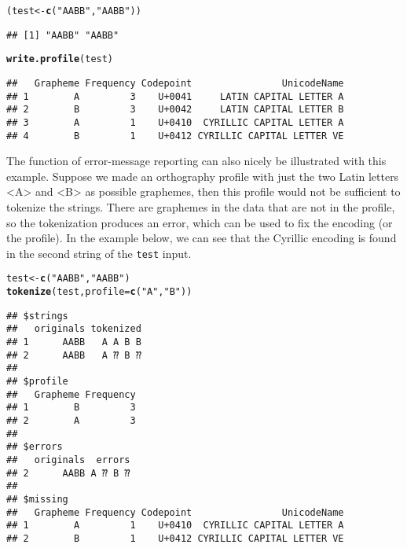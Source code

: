 \documentclass[output=book,nonflat,modfonts,
colorlinks, citecolor=brown,
		]{langsci/langscibook}\usepackage[]{graphicx}\usepackage[]{color}
\makeatletter
\newcommand{\hlstr}[1]{\textcolor[rgb]{0.192,0.494,0.8}{#1}}%
\newcommand{\hlstd}[1]{\textcolor[rgb]{0.345,0.345,0.345}{#1}}%
\newcommand{\hlkwb}[1]{\textcolor[rgb]{0.69,0.353,0.396}{#1}}%
\newcommand{\hlkwc}[1]{\textcolor[rgb]{0.333,0.667,0.333}{#1}}%
\newcommand{\hlkwd}[1]{\textcolor[rgb]{0.737,0.353,0.396}{\textbf{#1}}}%
\newenvironment{kframe}{%
 \def\at@end@of@kframe{}%
 \ifinner\ifhmode%
  \def\at@end@of@kframe{\end{minipage}}%
  \begin{minipage}{\columnwidth}%
 \fi\fi%
 \def\FrameCommand##1{\hskip\@totalleftmargin \hskip-\fboxsep
 \colorbox{shadecolor}{##1}\hskip-\fboxsep
     \hskip-\linewidth \hskip-\@totalleftmargin \hskip\columnwidth}%
 \MakeFramed {\advance\hsize-\width
   \@totalleftmargin\z@ \linewidth\hsize
   \@setminipage}}%
 {\par\unskip\endMakeFramed%
 \at@end@of@kframe}
\newenvironment{knitrout}{}{} %
\makeatother
\begin{document}
\begin{knitrout}\footnotesize
{}\color{fgcolor}\begin{kframe}
\begin{alltt}
\hlstd{(test} \hlkwb{<-} \hlkwd{c}\hlstd{(}\hlstr{"AABB"}\hlstd{,} \hlstr{"AАBВ"}\hlstd{))}
\end{alltt}
\begin{verbatim}
## [1] "AABB" "AАBВ"
\end{verbatim}
\begin{alltt}
\hlkwd{write.profile}\hlstd{(test)}
\end{alltt}
\begin{verbatim}
##   Grapheme Frequency Codepoint                UnicodeName
## 1        A         3    U+0041     LATIN CAPITAL LETTER A
## 2        B         3    U+0042     LATIN CAPITAL LETTER B
## 3        А         1    U+0410  CYRILLIC CAPITAL LETTER A
## 4        В         1    U+0412 CYRILLIC CAPITAL LETTER VE
\end{verbatim}
\end{kframe}
\end{knitrout}

The function of error-message reporting can also nicely be illustrated
with this example. Suppose we made an orthography profile with just the two
Latin letters <A> and <B> as possible graphemes, then this profile would not be
sufficient to tokenize the strings. There are graphemes in the data that are not
in the profile, so the tokenization produces an error, which can be used to fix
the encoding (or the profile). In the example below, we can see that the
Cyrillic encoding is found in the second string of the \texttt{test} input.

\begin{knitrout}\footnotesize
{}\color{fgcolor}\begin{kframe}
\begin{alltt}
\hlstd{test} \hlkwb{<-} \hlkwd{c}\hlstd{(}\hlstr{"AABB"}\hlstd{,} \hlstr{"AАBВ"}\hlstd{)}
\hlkwd{tokenize}\hlstd{(test,} \hlkwc{profile} \hlstd{=} \hlkwd{c}\hlstd{(}\hlstr{"A"}\hlstd{,} \hlstr{"B"}\hlstd{))}
\end{alltt}


{\ttfamily\noindent{}}\begin{verbatim}
## $strings
##   originals tokenized
## 1      AABB   A A B B
## 2      AАBВ   A ⁇ B ⁇
## 
## $profile
##   Grapheme Frequency
## 1        B         3
## 2        A         3
## 
## $errors
##   originals  errors
## 2      AАBВ A ⁇ B ⁇
## 
## $missing
##   Grapheme Frequency Codepoint                UnicodeName
## 1        А         1    U+0410  CYRILLIC CAPITAL LETTER A
## 2        В         1    U+0412 CYRILLIC CAPITAL LETTER VE
\end{verbatim}
\end{kframe}
\end{knitrout}
\end{document}

